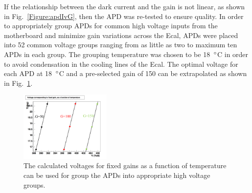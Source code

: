 If the relationship between the dark current and the gain is not linear, as shown in Fig.~\ref{Figure:apdIvG}, then the APD was re-tested to ensure quality. In order to appropriately group APDs for common high voltage inputs from the motherboard and minimize gain variations across the Ecal, APDs were placed into 52 common voltage groups ranging from as little as two to maximum ten APDs in each group. The grouping temperature was chosen to be 18~$\degree$C in order to avoid condensation in the cooling lines of the Ecal. The optimal voltage for each APD at 18~$\degree$C and a pre-selected gain of 150 can be extrapolated as shown in Fig.~\ref{Figure:apdTV}.


\begin{figure}[H]
  \centering
      \includegraphics[width=0.4\textwidth]{pics/experiment/apdTV.png}
  \caption[APD fixed gain in terms of voltage and temperature]{The calculated voltages for fixed gains as a function of temperature can be used for group the APDs into appropriate high voltage groups.}
  \label{Figure:apdTV}
\end{figure}
